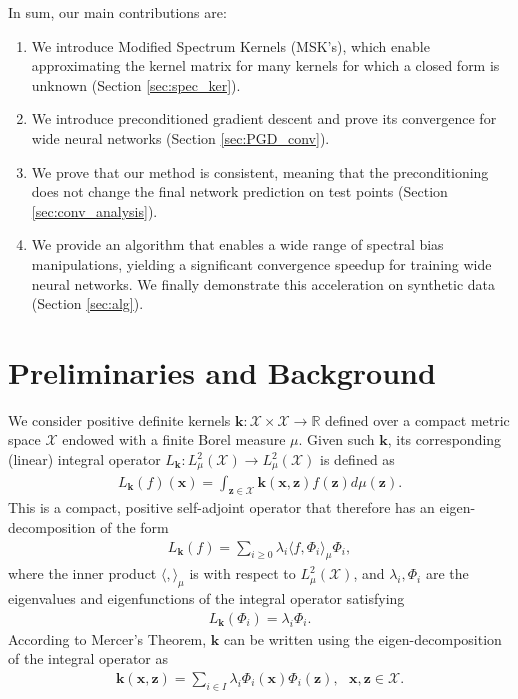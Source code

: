 \documentclass[10pt]{article} %
\theoremstyle{plain}
\theoremstyle{definition}
\theoremstyle{remark}
\newcommand{\Real}{\mathbb{R}}
\newcommand{\x}{\mathbf{x}}
\newcommand{\calx}{\mathcal{X}}
\newcommand{\z}{\mathbf{z}}
\newcommand{\kr}{\boldsymbol{k}}
\begin{document}
In sum, our main contributions are: 
\begin{enumerate}
    \item We introduce Modified Spectrum Kernels (MSK's), which enable approximating the kernel matrix for many kernels for which a closed form is unknown (Section \ref{sec:spec_ker}). 
    \item We introduce preconditioned gradient descent and prove its convergence for wide neural networks (Section \ref{sec:PGD_conv}).
    \item We prove that our method is consistent, meaning that the preconditioning does not change the final network prediction on test points (Section \ref{sec:conv_analysis}).
    \item We provide an algorithm that enables a wide range of spectral bias manipulations, yielding a significant convergence speedup for training wide neural networks. We finally demonstrate this acceleration on synthetic data (Section \ref{sec:alg}).
\end{enumerate}

\section{Preliminaries and Background}\label{sec:prelim}
We consider positive definite kernels $\kr: \calx \times \calx \rightarrow \Real$ defined over a compact metric space $\calx$ endowed with a finite Borel measure $\mu$.
Given such $\kr$, its corresponding (linear) integral operator $L_{\kr}:L^2_\mu (\calx)\to L^2_\mu (\calx)$ is defined as
\begin{align*}
    L_{\kr}(f)(\x)=\int_{\z \in \calx} \kr(\x,\z) f(\z) d\mu(\z).
\end{align*}
This is a compact, positive self-adjoint operator that therefore has an eigen-decomposition of the form
\begin{align*}
    L_{\kr}(f)=\sum_{i\geq 0}\lambda_i\langle f,\Phi_i\rangle_\mu \Phi_i,
\end{align*}
where the inner product $\langle , \rangle_\mu $ is with respect to $L^2_\mu(\mathcal{X})$, and $\lambda_i,\Phi_i$ are the eigenvalues and eigenfunctions of the integral operator satisfying
\begin{align*}
    L_{\kr}(\Phi_i)=\lambda_i \Phi_i.
\end{align*}
According to Mercer's Theorem, $\kr$ can be written using the eigen-decomposition of the integral operator as
\begin{align}  \label{eq:mercer}
    \kr(\x,\z)=\sum_{i\in I} \lambda_i \Phi_i(\x) \Phi_i(\z), ~~~ \x,\z \in {\calx}.
\end{align}
\end{document}
